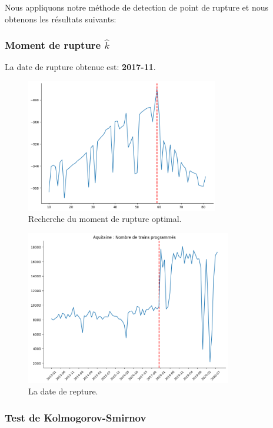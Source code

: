 {Nous appliquons notre méthode de detection de point de rupture et nous obtenons les résultats suivants:

\subsubsection{Moment de rupture $\hat{k}$}

La date de rupture obtenue est: \textbf{2017-11}. 


\begin{figure}[H]
\centering
\includegraphics[width=0.75\textwidth]{image/AQ-FIG3.png} 
\caption{Recherche du moment de rupture optimal.}
\label{fig:trains_ANNULES_2}
\end{figure}


\begin{figure}[H]
\centering
\includegraphics[width=0.8\textwidth]{image/AQ-FIG4.png} 
\caption{La date de repture.}
\label{fig:trains_programmes_2}
\end{figure}

\subsubsection{Test de Kolmogorov-Smirnov}

}
